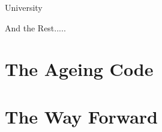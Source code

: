 \documentclass{beamer}
\begin{document}
\begin{frame}{University}
\begin{figure}
    \end{figure}
  \end{frame}

  \begin{frame}{And the Rest.....}

  \end{frame}

\section{The Ageing Code}

\section{The Way Forward}
\end{document}
